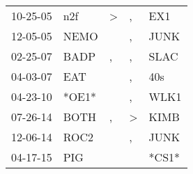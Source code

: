\begin{supertabular}{p{0.07\textwidth}p{0.06\textwidth}p{0.02\textwidth}p{0.02\textwidth}p{0.06\textwidth}}
 10-25-05\textsuperscript{} &            n2f\textsuperscript{} &  \textgreater &             , &            EX1\textsuperscript{} \\
 12-05-05\textsuperscript{} &           NEMO\textsuperscript{} &               &             , &           JUNK\textsuperscript{} \\
 02-25-07\textsuperscript{} &           BADP\textsuperscript{} &             , &             , &           SLAC\textsuperscript{} \\
 04-03-07\textsuperscript{} &            EAT\textsuperscript{} &               &             , &            40s\textsuperscript{} \\
 04-23-10\textsuperscript{} &                            *OE1* &               &             , &           WLK1\textsuperscript{} \\
 07-26-14\textsuperscript{} &           BOTH\textsuperscript{} &             , &  \textgreater &           KIMB\textsuperscript{} \\
 12-06-14\textsuperscript{} &           ROC2\textsuperscript{} &               &             , &           JUNK\textsuperscript{} \\
 04-17-15\textsuperscript{} &            PIG\textsuperscript{} &               &               &                            *CS1* \\
\end{supertabular}
